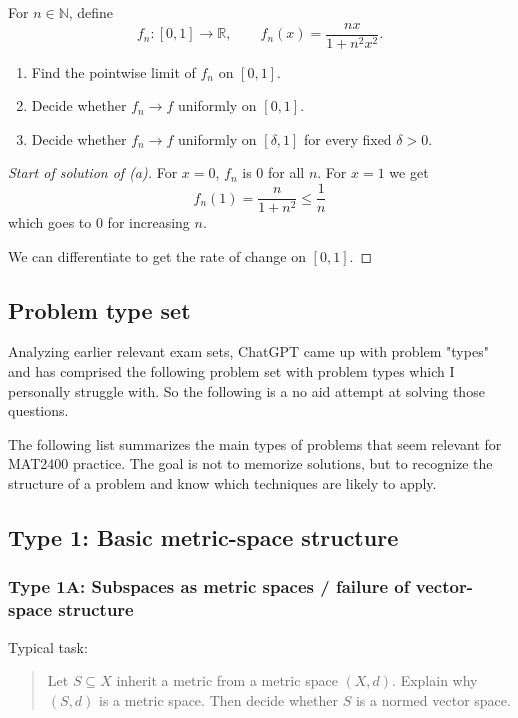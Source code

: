 \begin{prob}[Problem 5]
For $n\in\mathbb N$, define
\[
    f_n:[0,1]\to\mathbb R,\qquad f_n(x)=\frac{nx}{1+n^2x^2}.
\]

\begin{enumerate}[label=\alph*)]
    \item Find the pointwise limit of $f_n$ on $[0,1]$.

    \item Decide whether $f_n\to f$ uniformly on $[0,1]$.

    \item Decide whether $f_n\to f$ uniformly on $[\delta,1]$ for every fixed $\delta>0$.
\end{enumerate}
\end{prob}
\begin{proof}[Start of solution of (a)]
    For $x = 0$, $f_n$ is $0$ for all $n$.  
    For $x = 1$ we get 
    \[
        f_n(1) = \frac{n}{1 + n^2} \leq \frac{1}{n}
    \]
    which goes to $0$ for increasing $n$.

    We can differentiate to get the rate of change on 
    $[0,1]$.
\end{proof}

\subsection{Problem type set}
Analyzing earlier relevant exam sets, ChatGPT came up with 
problem "types" and has comprised the following problem set 
with problem types which I personally struggle with. 
So the following is a no aid attempt at solving those questions.

The following list summarizes the main types of problems that seem relevant for MAT2400 practice. The goal is not to memorize solutions, but to recognize the structure of a problem and know which techniques are likely to apply.

\subsection{Type 1: Basic metric-space structure}

\subsubsection*{Type 1A: Subspaces as metric spaces / failure of vector-space structure}

Typical task:
\begin{quote}
    Let $S\subseteq X$ inherit a metric from a metric space $(X,d)$. Explain why $(S,d)$ is a metric space. Then decide whether $S$ is a normed vector space.
\end{quote}

